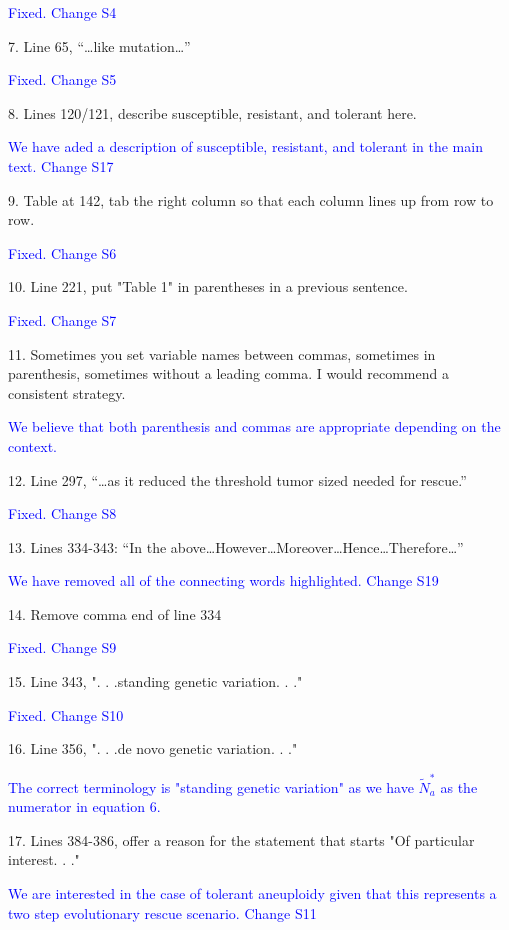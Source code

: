 \documentclass[12pt]{extarticle}
\begin{document}
\textcolor{blue}{Fixed. Change S4}

7. Line 65, ``\dots like mutation\ldots''

\textcolor{blue}{Fixed. Change S5}

8. Lines 120/121, describe susceptible, resistant, and tolerant here.

\textcolor{blue}{We have aded a description of susceptible, resistant, and tolerant in the main text. Change S17}

9. Table at 142, tab the right column so that each column lines up from row to row.

\textcolor{blue}{Fixed. Change S6}

10. Line 221, put "Table 1" in parentheses in a previous sentence.

\textcolor{blue}{Fixed. Change S7}

11. Sometimes you set variable names between commas, sometimes in parenthesis, sometimes without a leading comma. I would recommend a consistent strategy.

\textcolor{blue}{We believe that both parenthesis and commas are appropriate depending on the context.}

12. Line 297, ``\ldots as it reduced the threshold tumor sized needed for rescue.''

\textcolor{blue}{Fixed. Change S8}

13. Lines 334-343: ``In the above\ldots However\ldots Moreover\ldots Hence\dots Therefore\ldots ''

\textcolor{blue}{We have removed all of the connecting words highlighted. Change S19}

14. Remove comma end of line 334

\textcolor{blue}{Fixed. Change S9}

15. Line 343, ". . .standing genetic variation. . ."

\textcolor{blue}{Fixed. Change S10}

16. Line 356, ". . .de novo genetic variation. . ."

\textcolor{blue}{The correct terminology is "standing genetic variation" as we have $\tilde{N}_a^*$ as the numerator in equation 6.}

17. Lines 384-386, offer a reason for the statement that starts "Of particular interest. . ."

\textcolor{blue}{We are interested in the case of tolerant aneuploidy given that this represents a two step evolutionary rescue scenario. Change S11}
\end{document}
